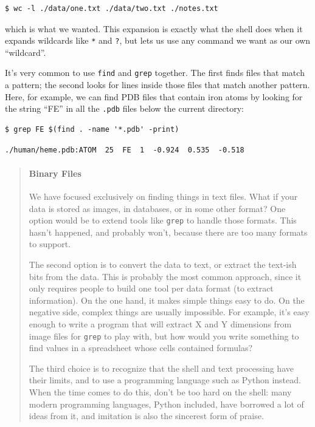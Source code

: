 \documentclass{book}
\begin{document}
\begin{verbatim}
$ wc -l ./data/one.txt ./data/two.txt ./notes.txt
\end{verbatim}

which is what we wanted. This expansion is exactly what the shell does
when it expands wildcards like \texttt{*} and \texttt{?}, but lets us
use any command we want as our own ``wildcard''.

It's very common to use \texttt{find} and \texttt{grep} together. The
first finds files that match a pattern; the second looks for lines
inside those files that match another pattern. Here, for example, we can
find PDB files that contain iron atoms by looking for the string ``FE''
in all the \texttt{.pdb} files below the current directory:

\begin{verbatim}
$ grep FE $(find . -name '*.pdb' -print)
\end{verbatim}

\begin{verbatim}
./human/heme.pdb:ATOM  25  FE  1  -0.924  0.535  -0.518
\end{verbatim}

\begin{quote}
\mbox{}\paragraph{Binary Files}

We have focused exclusively on finding things in text files. What if
your data is stored as images, in databases, or in some other format?
One option would be to extend tools like \texttt{grep} to handle those
formats. This hasn't happened, and probably won't, because there are too
many formats to support.

The second option is to convert the data to text, or extract the
text-ish bits from the data. This is probably the most common approach,
since it only requires people to build one tool per data format (to
extract information). On the one hand, it makes simple things easy to
do. On the negative side, complex things are usually impossible. For
example, it's easy enough to write a program that will extract X and Y
dimensions from image files for \texttt{grep} to play with, but how
would you write something to find values in a spreadsheet whose cells
contained formulas?

The third choice is to recognize that the shell and text processing have
their limits, and to use a programming language such as Python instead.
When the time comes to do this, don't be too hard on the shell: many
modern programming languages, Python included, have borrowed a lot of
ideas from it, and imitation is also the sincerest form of praise.
\end{quote}
\end{document}
